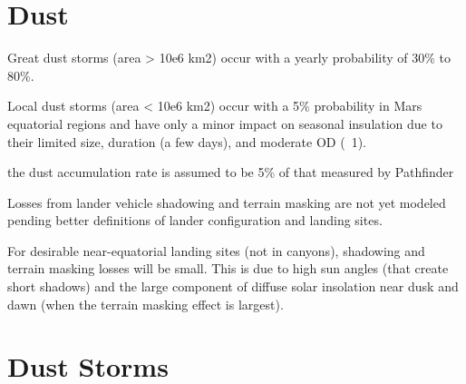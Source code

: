 %



\section{Dust}
\label{sec:MartianEnvironment:Dust}
%


Great dust storms (area > 10e6 km2) occur with a yearly probability of 30\% to 80\%. 

Local dust storms (area < 10e6 km2) occur with a 5\% probability in Mars equatorial regions and have only a minor impact on seasonal insulation due to their limited size, duration (a few days), and moderate OD (~1). 

the dust accumulation rate is assumed to be 5\% of that measured by Pathfinder 

Losses from lander vehicle shadowing and terrain masking are not yet modeled pending better definitions of lander configuration and landing sites. 

For desirable near-equatorial landing sites (not in canyons), shadowing and terrain masking losses will be small. This is due to high sun angles (that create short shadows) and the large component of diffuse solar insolation near dusk and dawn (when the terrain masking effect is largest). 


\section{Dust Storms}
\label{sec:MartianEnvironment:DustStorms}
%
